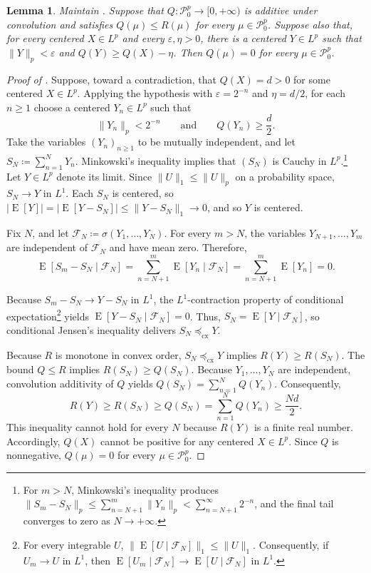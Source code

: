 \documentclass[11pt]{amsart}
\theoremstyle{plain}
\newtheorem{lemma}{Lemma}
\theoremstyle{definition}
\theoremstyle{remark}
\numberwithin{equation}{section}
\newcommand{\1}{\mathbf 1}
\begin{document}
\begin{lemma}\label{lem:stacking}
Maintain . Suppose that \(Q\colon\mathcal P_0^p\to[0,+\infty)\) is additive under convolution and satisfies \(Q(\mu)\leq R(\mu)\) for every \(\mu\in\mathcal P_0^p\). Suppose also that, for every centered \(X\in L^p\) and every \(\varepsilon,\eta>0\), there is a centered \(Y\in L^p\) such that \(\lVert Y\rVert_p<\varepsilon\) and \(Q(Y)\geq Q(X)-\eta\). Then \(Q(\mu)=0\) for every \(\mu\in\mathcal P_0^p\).
\end{lemma}

\begin{proof}[Proof of ]
Suppose, toward a contradiction, that \(Q(X)=d>0\) for some centered \(X\in L^p\). Applying the hypothesis with \(\varepsilon=2^{-n}\) and \(\eta=d/2\), for each \(n\geq1\) choose a centered \(Y_n\in L^p\) such that
\[
\lVert Y_n\rVert_p<2^{-n}
\qquad\text{and}\qquad
Q(Y_n)\geq\frac d2.
\]
Take the variables \((Y_n)_{n\geq1}\) to be mutually independent, and let \(S_N\coloneqq\sum_{n=1}^NY_n\). Minkowski's inequality implies that \((S_N)\) is Cauchy in \(L^p\).\footnote{For \(m>N\), Minkowski's inequality produces \(\lVert S_m-S_N\rVert_p\leq\sum_{n=N+1}^m\lVert Y_n\rVert_p<\sum_{n=N+1}^{\infty}2^{-n}\), and the final tail converges to zero as \(N\to+\infty\).} Let \(Y\in L^p\) denote its limit. Since \(\lVert U\rVert_1\leq\lVert U\rVert_p\) on a probability space, \(S_N\to Y\) in \(L^1\). Each \(S_N\) is centered, so
\(\left|\operatorname{E}[Y]\right|
=
\left|\operatorname{E}[Y-S_N]\right|
\leq
\lVert Y-S_N\rVert_1
\rightarrow0\), and so \(Y\) is centered.

Fix \(N\), and let \(\mathcal F_N\coloneqq\sigma(Y_1,\ldots,Y_N)\). For every \(m>N\), the variables \(Y_{N+1},\ldots,Y_m\) are independent of \(\mathcal F_N\) and have mean zero. Therefore,
\[\operatorname{E}\left[S_m-S_N\mid\mathcal F_N\right] =  \sum_{n=N+1}^m\operatorname{E}\left[Y_n\mid\mathcal F_N\right] = \sum_{n=N+1}^m\operatorname{E}[Y_n] = 0.\]

Because \(S_m-S_N\to Y-S_N\) in \(L^1\), the \(L^1\)-contraction property of conditional expectation\footnote{For every integrable \(U\), \(\lVert\operatorname{E}[U\mid\mathcal F_N]\rVert_1\leq\lVert U\rVert_1\). Consequently, if \(U_m\to U\) in \(L^1\), then \(\operatorname{E}[U_m\mid\mathcal F_N]\to\operatorname{E}[U\mid\mathcal F_N]\) in \(L^1\).} yields
\(\operatorname{E}\left[Y-S_N\mid\mathcal F_N\right]=0\). Thus, \(S_N=\operatorname{E}[Y\mid\mathcal F_N]\), so conditional Jensen's inequality delivers \(S_N\preceq_{\mathrm{cx}}Y\). 

Because \(R\) is monotone in convex order, \(S_N\preceq_{\mathrm{cx}}Y\) implies \(R(Y)\geq R(S_N)\). The bound \(Q\leq R\) implies \(R(S_N)\geq Q(S_N)\). Because \(Y_1,\ldots,Y_N\) are independent, convolution additivity of \(Q\) yields \(Q(S_N)=\sum_{n=1}^NQ(Y_n)\). Consequently,
\[
R(Y)\geq R(S_N)\geq Q(S_N)
=\sum_{n=1}^NQ(Y_n)
\geq\frac{Nd}{2}.
\]
This inequality cannot hold for every \(N\) because \(R(Y)\) is a finite real number. Accordingly, \(Q(X)\) cannot be positive for any centered \(X\in L^p\). Since \(Q\) is nonnegative, \(Q(\mu)=0\) for every \(\mu\in\mathcal P_0^p\).
\end{proof}
\end{document}
